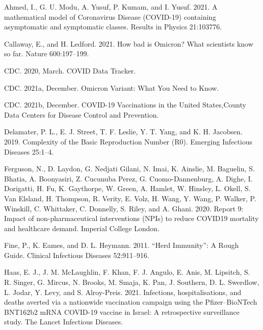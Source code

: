 \documentclass[
  12pt,
]{article}
\newlength{\cslhangindent}
\newlength{\cslentryspacingunit} %
\newenvironment{CSLReferences}[2] %
 {%
  \setlength{\parindent}{0pt}
  \ifodd #1
  \let\oldpar\par
  \def\par{\hangindent=\cslhangindent\oldpar}
  \fi
  \setlength{\parskip}{#2\cslentryspacingunit}
 }%
 {}
\begin{document}
\hypertarget{refs}{}
\begin{CSLReferences}{1}{0}
\leavevmode{}%
Ahmed, I., G. U. Modu, A. Yusuf, P. Kumam, and I. Yusuf. 2021. A mathematical model of {Coronavirus} {Disease} ({COVID}-19) containing asymptomatic and symptomatic classes. Results in Physics 21:103776.

\leavevmode{}%
Callaway, E., and H. Ledford. 2021. How bad is {Omicron}? {What} scientists know so far. Nature 600:197--199.

\leavevmode{}%
CDC. 2020, March. {COVID} {Data} {Tracker}.

\leavevmode{}%
CDC. 2021a, December. Omicron {Variant}: {What} {You} {Need} to {Know}.

\leavevmode{}%
CDC. 2021b, December. {COVID}-19 {Vaccinations} in the {United} {States},{County} {\textbar} {Data} {\textbar} {Centers} for {Disease} {Control} and {Prevention}.

\leavevmode{}%
Delamater, P. L., E. J. Street, T. F. Leslie, Y. T. Yang, and K. H. Jacobsen. 2019. Complexity of the {Basic} {Reproduction} {Number} ({R0}). Emerging Infectious Diseases 25:1--4.

\leavevmode{}%
Ferguson, N., D. Laydon, G. Nedjati Gilani, N. Imai, K. Ainslie, M. Baguelin, S. Bhatia, A. Boonyasiri, Z. Cucunuba Perez, G. Cuomo-Dannenburg, A. Dighe, I. Dorigatti, H. Fu, K. Gaythorpe, W. Green, A. Hamlet, W. Hinsley, L. Okell, S. Van Elsland, H. Thompson, R. Verity, E. Volz, H. Wang, Y. Wang, P. Walker, P. Winskill, C. Whittaker, C. Donnelly, S. Riley, and A. Ghani. 2020. Report 9: {Impact} of non-pharmaceutical interventions ({NPIs}) to reduce {COVID19} mortality and healthcare demand. Imperial College London.

\leavevmode{}%
Fine, P., K. Eames, and D. L. Heymann. 2011. {``{Herd} {Immunity}''}: {A} {Rough} {Guide}. Clinical Infectious Diseases 52:911--916.

\leavevmode{}%
Haas, E. J., J. M. McLaughlin, F. Khan, F. J. Angulo, E. Anis, M. Lipsitch, S. R. Singer, G. Mircus, N. Brooks, M. Smaja, K. Pan, J. Southern, D. L. Swerdlow, L. Jodar, Y. Levy, and S. Alroy-Preis. 2021. Infections, hospitalisations, and deaths averted via a nationwide vaccination campaign using the {Pfizer}--{BioNTech} {BNT162b2} {mRNA} {COVID}-19 vaccine in {Israel}: A retrospective surveillance study. The Lancet Infectious Diseases.


\end{CSLReferences}
\end{document}
